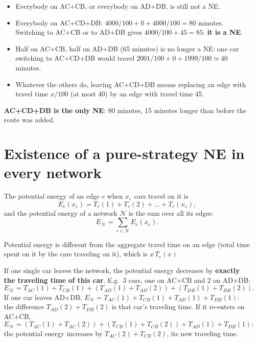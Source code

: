 \documentclass[11pt,a4paper,openany]{book}
\begin{document}
\begin{propbox}[title=The only NE is worse for everybody]
\begin{itemize}
  \item Everybody on AC+CB, or everybody on AD+DB, is still not a NE.
  \item Everybody on AC+CD+DB: $4000/100 + 0 + 4000/100 = 80$ minutes. Switching to AC+CB
        or to AD+DB gives $4000/100 + 45 = 85$: \textbf{it is a NE}.
  \item Half on AC+CB, half on AD+DB (65 minutes) is no longer a NE: one car switching to
        AC+CD+DB would travel $2001/100 + 0 + 1999/100 \simeq 40$ minutes.
  \item Whatever the others do, leaving AC+CD+DB means replacing an edge with travel time
        $x/100$ (at most 40) by an edge with travel time 45.
\end{itemize}
\textbf{AC+CD+DB is the only NE}: 80 minutes, 15 minutes longer than before the route was
added.
\end{propbox}


\section{Existence of a pure-strategy NE in every network}

\begin{defnbox}[title=Potential energy]
The potential energy of an edge $e$ when $x_e$ cars travel on it is
\[
E_e(x_e) = T_e(1) + T_e(2) + \ldots + T_e(x_e),
\]
and the potential energy of a network $\mathcal{N}$ is the sum over all its edges:
\[
E_{\mathcal{N}} = \sum_{e \in \mathcal{N}} E_e(x_e).
\]
\end{defnbox}

\begin{warnbox}[title=Not the total travel time]
Potential energy is different from the aggregate travel time on an edge (total time spent on
it by the cars traveling on it), which is $x\,T_e(x)$.
\end{warnbox}


\begin{propbox}[title=A car leaving or entering the network]
If one single car leaves the network, the potential energy decreases by \textbf{exactly the
traveling time of this car}. E.g.\ 3 cars, one on AC+CB and 2 on AD+DB:
\[
E_{\mathcal{N}} = T_{AC}(1) + T_{CB}(1) + (T_{AD}(1) + T_{AD}(2)) + (T_{DB}(1) + T_{DB}(2)).
\]
If one car leaves AD+DB, $E_{\mathcal{N}} = T_{AC}(1) + T_{CB}(1) + T_{AD}(1) + T_{DB}(1)$:
the difference $T_{AD}(2) + T_{DB}(2)$ is that car's traveling time. If it re-enters on
AC+CB,
\[
E_{\mathcal{N}} = (T_{AC}(1) + T_{AC}(2)) + (T_{CB}(1) + T_{CB}(2)) + T_{AD}(1) + T_{DB}(1):
\]
the potential energy increases by $T_{AC}(2) + T_{CB}(2)$, its new traveling time.
\end{propbox}
\end{document}
